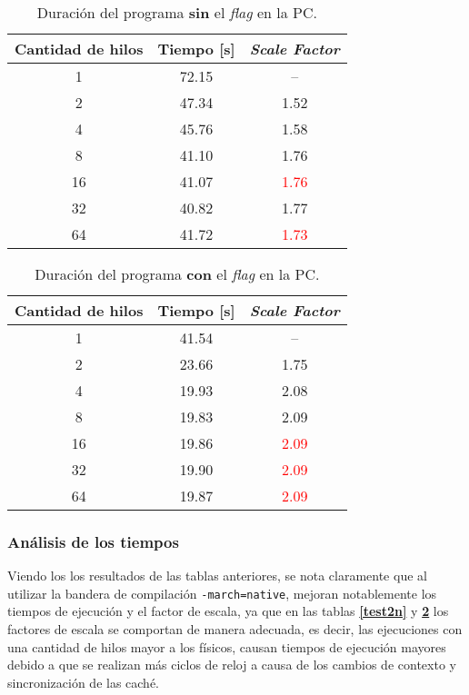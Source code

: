 \documentclass[12pt,a4paper]{article}
\begin{document}
\begin{table}[H]
  \centering
  \begin{tabular}{|| c | c | c ||} \hline
    Cantidad de hilos & Tiempo {[}s{]} & \emph{Scale Factor}\\ \hline
    1                 & 72.15          & -- \\ \hline
    2                 & 47.34          & 1.52   \\ \hline
    4                 & 45.76          & 1.58   \\ \hline
    8                 & 41.10          & \textcolor{OliveGreen}{1.76}   \\ \hline
    16                & 41.07          & \textcolor{Red}{1.76}   \\ \hline
    32                & 40.82          & 1.77   \\ \hline
    64                & 41.72          & \textcolor{Red}{1.73}   \\ \hline
  \end{tabular}
  \caption{Duración del programa \textbf{sin} el \emph{flag} en la PC.}
  \label{test1p}
\end{table}


\begin{table}[H]
  \centering
  \begin{tabular}{|| c | c | c ||} \hline
    Cantidad de hilos & Tiempo {[}s{]} & \emph{Scale Factor}\\ \hline
    1                 & 41.54          & -- \\ \hline
    2                 & 23.66          & 1.75   \\ \hline
    4                 & 19.93          & 2.08   \\ \hline
    8                 & 19.83          & \textcolor{OliveGreen}{2.09}   \\ \hline
    16                & 19.86          & \textcolor{Red}{2.09}   \\ \hline
    32                & 19.90          & \textcolor{Red}{2.09}   \\ \hline
    64                & 19.87          & \textcolor{Red}{2.09}   \\ \hline
  \end{tabular}
  \caption{Duración del programa \textbf{con} el \emph{flag} en la PC.}
  \label{test2p}
\end{table}

\subsubsection{Análisis de los tiempos}
\label{analisis}
Viendo los los resultados de las tablas anteriores, se nota claramente que al
utilizar la bandera de compilación \verb|-march=native|, mejoran notablemente
los tiempos de ejecución y el factor de escala, ya que en las tablas
\textbf{\ref{test2n}} y \textbf{\ref{test2p}} los factores de escala se
comportan de manera adecuada, es decir, las ejecuciones con una cantidad de
hilos mayor a los físicos, causan tiempos de ejecución mayores debido a que se
realizan más ciclos de reloj a causa de los cambios de contexto y sincronización
de las caché.
\end{document}
